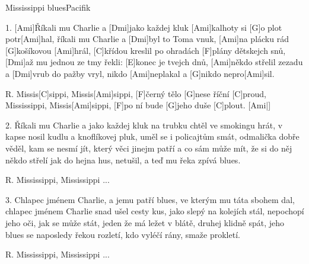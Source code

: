 \begin{song}{Mississippi blues}{Pacifik}


\begin{xverse}{1. }
[Ami]{Ří}kali mu Charlie a [Dmi]jako každej kluk
[Ami]kalhoty si [G]o plot potr[Ami]hal,
říkali mu Charlie a [Dmi]byl to Toma vnuk,
[Ami]na plácku rád [G]košíkovou [Ami]hrál,
[C]křídou kreslil po ohradách [F]plány dětskejch snů,
[Dmi]až mu jednou ze tmy řekli: [E]konec je tvejch dnů,
[Ami]někdo střelil zezadu a [Dmi]vrub do pažby vryl,
nikdo [Ami]neplakal a [G]nikdo nepro[Ami]sil.
\end{xverse}


\begin{xverse}{R. }
Missis[C]sippi, Missis[Ami]sippi, [F]{čer}ný tělo [G]nese říční [C]proud,
Mississippi, Missis[Ami]sippi, [F]po ní bude [G]jeho duše [C]plout. [Ami|]{}
\end{xverse}


\begin{xverse}{2. }
Říkali mu Charlie a jako každej kluk
na trubku chtěl ve smokingu hrát,
v kapse nosil kudlu a knoflíkovej pluk,
uměl se i policajtům smát,
odmalička dobře věděl, kam se nesmí jít,
který věci jinejm patří a co sám může mít,
že si do něj někdo střelí jak do hejna hus,
netušil, a teď mu řeka zpívá blues.

\end{xverse}

\begin{xverse}{R. }
Mississippi, Mississippi ...
\end{xverse}


\begin{xverse}{3. }
Chlapec jménem Charlie, a jemu patří blues,
ve kterým mu táta sbohem dal,
chlapec jménem Charlie snad ušel cesty kus,
jako slepý na kolejích stál,
nepochopí jeho oči, jak se může stát,
jeden že má ležet v blátě, druhej klidně spát,
jeho blues se naposledy řekou rozletí,
kdo vyléčí rány, smaže prokletí.
\end{xverse}

\begin{xverse}{R. }
Mississippi, Mississippi ...
\end{xverse}

\end{song}

